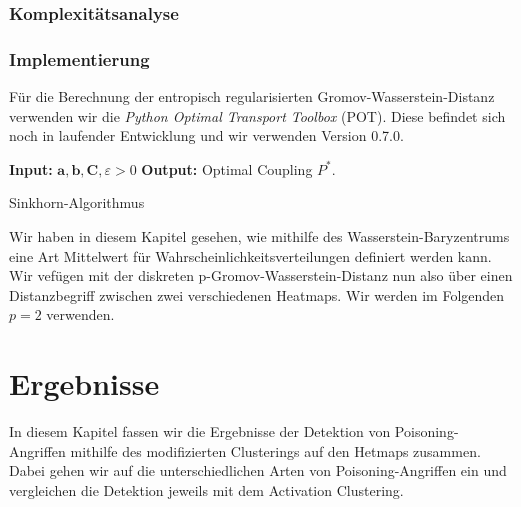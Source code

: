 \documentclass[11pt,a4paper]{article}
\numberwithin{equation}{section}
\begin{document}
	
	
	
	\subsubsection{Komplexitätsanalyse}
	
	
	\subsubsection{Implementierung}
	
	Für die Berechnung der entropisch regularisierten Gromov-Wasserstein-Distanz verwenden wir die \textit{Python Optimal Transport Toolbox} (POT). Diese befindet sich noch in laufender Entwicklung und wir verwenden Version 0.7.0. 
	
	\begin{algorithm}
		\hspace*{\algorithmicindent} \textbf{Input: } $\boldsymbol{a}, \boldsymbol{b}, \boldsymbol{C}, \varepsilon > 0$		\newline
		\hspace*{\algorithmicindent} \textbf{Output: } Optimal Coupling $P^*$. 
		
		\caption{Sinkhorn-Algorithmus}
		\label{alg:sinkhorn}
		\begin{algorithmic}
			\REPEAT
		\end{algorithmic}	
	\end{algorithm}
	
	Wir haben in diesem Kapitel gesehen, wie mithilfe des Wasserstein-Baryzentrums eine Art Mittelwert für Wahrscheinlichkeitsverteilungen definiert werden kann.\\
	
	Wir vefügen mit der diskreten p-Gromov-Wasserstein-Distanz nun also über einen Distanzbegriff zwischen zwei verschiedenen Heatmaps. Wir werden im Folgenden $p=2$ verwenden. 
	
	\section{Ergebnisse} \label{chapter_comparisons}
	
	In diesem Kapitel fassen wir die Ergebnisse der Detektion von Poisoning-Angriffen mithilfe des modifizierten Clusterings auf den Hetmaps zusammen. Dabei gehen wir auf die unterschiedlichen Arten von Poisoning-Angriffen ein und vergleichen die Detektion jeweils mit dem Activation Clustering.
	
\end{document}
